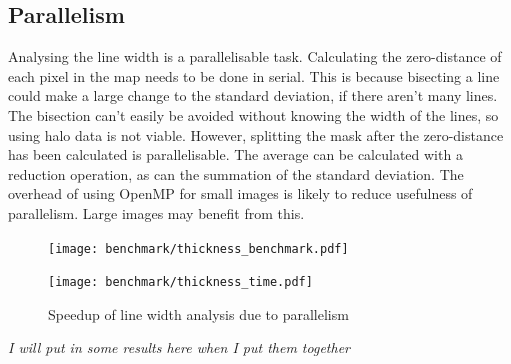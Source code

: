 \documentclass[../main.tex]{subfiles}
\begin{document}
  \subsection{Parallelism}
    Analysing the line width is a parallelisable task.
    Calculating the zero-distance of each pixel in the map needs to be done in serial.
    This is because bisecting a line could make a large change to the standard deviation, if there aren't many lines.
    The bisection can't easily be avoided without knowing the width of the lines, so using halo data is not viable.
    However, splitting the mask after the zero-distance has been calculated is parallelisable.
    The average can be calculated with a reduction operation, as can the summation of the standard deviation.
    The overhead of using OpenMP for small images is likely to reduce usefulness of parallelism.
    Large images may benefit from this.

    \begin{figure}[h]
      \centering
      \texttt{[image: benchmark/thickness\_benchmark.pdf]}

      \texttt{[image: benchmark/thickness\_time.pdf]}
      \caption{Speedup of line width analysis due to parallelism}
      \label{thicknessbenchmark}
    \end{figure}
    \textit{I will put in some results here when I put them together}
    \biblio
\end{document}
